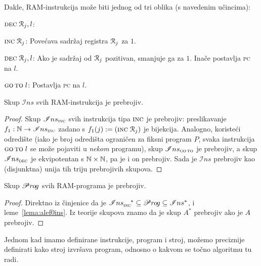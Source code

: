Dakle, RAM-instrukcija može biti jednog od tri oblika (s navedenim učincima):
\begin{labeling}{$\textsc{dec}\;\mathcal R_{j},l$:}
    \item[$\textsc{inc}\;\mathcal R_{j}$:] Povećava sadržaj registra $\mathcal R_{j}$ za $1$.
    \item[$\textsc{dec}\;\mathcal R_{j},l$:] Ako je sadržaj od $\mathcal R_{j}$ pozitivan, smanjuje ga za $1$. Inače postavlja \textsc{pc} na $l$.
    \item[$\textsc{go\,to}\;l$:] Postavlja \textsc{pc} na $l$.
\end{labeling}

\begin{lema}[{name=[prebrojivost skupa $\mathscr Ins$]}]\label{lema:alef0ins}
Skup $\mathscr Ins$ svih RAM-instrukcija je prebrojiv\!.
\end{lema}
\begin{proof}
Skup $\mathscr Ins_{\textsc{inc}}$ svih instrukcija tipa $\textsc{inc}$ je prebrojiv: preslikavanje $f_1:{\mathbb N}\to\mathscr Ins_{\textsc{inc}}$ zadano s $f_1(j):=(\textsc{inc}\;\mathcal R_{j})$ je bijekcija. Analogno, koristeći odredište (iako je broj odredišta ograničen za fiksni program $P$, svaka instrukcija $\textsc{go\,to}\;l$ se može pojaviti u \emph{nekom} programu), skup $\mathscr Ins_{\textsc{go\,to}}$ je prebrojiv\!, a skup $\mathscr Ins_{\textsc{dec}}$ je ek\-vi\-po\-ten\-tan s ${\mathbb N}\times{\mathbb N}$, pa je i on prebrojiv\!. Sada je $\mathscr Ins$ prebrojiv kao (disjunktna) unija tih triju prebrojivih skupova.
\end{proof}

\begin{korolar}[{name=[prebrojivost skupa $\mathscr Pr\mspace{-1mu}o\mspace{-2mu}g$]}]\label{kor:alef0prog}
	Skup $\mathscr Pr\mspace{-1mu}o\mspace{-2mu}g$ svih RAM-programa je prebrojiv\!.
\end{korolar}
\begin{proof}
	Direktno iz činjenice da je $\mathscr Ins_{\textsc{inc}}^{\quad*}\subseteq\mathscr Pr\mspace{-1mu}o\mspace{-2mu}g\subseteq\mathscr Ins^*$, i leme~\ref{lema:alef0ins}. Iz teorije skupova znamo da je skup $A^*$ prebrojiv ako je $A$ prebrojiv\!.
\end{proof}


Jednom kad imamo definirane instrukcije, program i stroj, možemo preciznije definirati kako stroj izvršava program, odnosno o kakvom se točno algoritmu tu radi.

